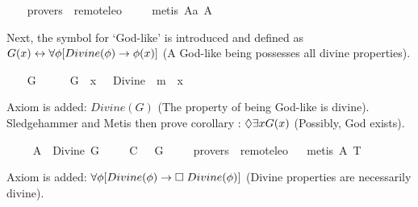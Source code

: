 \begin{isabellebody}
\ \ \isamarkupfalse%
\ {\isacharbrackleft}provers\ {\isacharequal}\ remote{\isacharunderscore}leo{}{\isacharbrackright}\ \isanewline
%
\isadelimproof
\ \ %
\endisadelimproof
%
\isatagproof
{}\isamarkupfalse%
\ {\isacharparenleft}metis\ A{}a\ A{}{\isacharparenright}%
\endisatagproof
{\isafoldproof}%
%
\isadelimproof
%
\endisadelimproof
%
\begin{isamarkuptext}%
Next, the symbol  for `God-like'  is introduced and defined 
as $G(x) \leftrightarrow \forall \phi [Divine(\phi) \to \phi(x)]$ (A God-like being possesses 
all divine properties).%
\end{isamarkuptext}%
\isamarkuptrue%
\ \ \isamarkupfalse%
\ G\ {\isacharcolon}{\isacharcolon}\ {\isachardoublequoteopen}{\isasymmu}\ {\isasymRightarrow}\ {\isasymsigma}{\isachardoublequoteclose}\ \ {\isachardoublequoteopen}G\ {\isacharequal}\ {\isacharparenleft}{\isasymlambda}x{\isachardot}\ {\isasymPi}\ {\isacharparenleft}{\isasymlambda}{\isasymPhi}{\isachardot}\ Divine\ {\isasymPhi}\ m{\isasymRightarrow}\ {\isasymPhi}\ x{\isacharparenright}{\isacharparenright}{\isachardoublequoteclose}%
\begin{isamarkuptext}%
Axiom  is added: $Divine(G)$ (The property of being God-like is divine).
Sledgehammer and Metis then prove corollary : $\Diamond \exists x G(x)$ 
(Possibly, God exists).%
\end{isamarkuptext}%
\isamarkuptrue%
\ \ \isamarkupfalse%
\ \ A{}{\isacharcolon}\ \ {\isachardoublequoteopen}{\isacharbrackleft}Divine\ G{\isacharbrackright}{\isachardoublequoteclose}\ \isanewline
\isanewline
\ \ \isamarkupfalse%
\ C{\isacharcolon}\ {\isachardoublequoteopen}{\isacharbrackleft}{\isasymdiamond}\ {\isacharparenleft}{\isasymexists}\ G{\isacharparenright}{\isacharbrackright}{\isachardoublequoteclose}\ \isanewline
\ \ \isamarkupfalse%
\ {\isacharbrackleft}provers\ {\isacharequal}\ remote{\isacharunderscore}leo{}{\isacharbrackright}%
\isadelimproof
\ %
\endisadelimproof
%
\isatagproof
{}\isamarkupfalse%
\ {\isacharparenleft}metis\ A{}\ T{}{\isacharparenright}%
\endisatagproof
{\isafoldproof}%
%
\isadelimproof
%
\endisadelimproof
%
\begin{isamarkuptext}%
Axiom  is added: $\forall \phi [Divine(\phi) \to \Box \; Divine(\phi)]$ 
(Divine properties are necessarily divine).%

\end{isamarkuptext}
\end{isabellebody}
